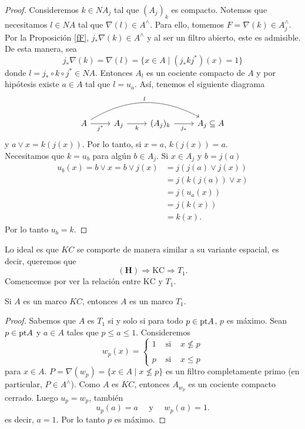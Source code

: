 \begin{proof}
Consideremos $k\in NA_j$ tal que $(A_j)_k$ es compacto. Notemos que necesitamos $l\in NA$ tal que $\nabla(l)\in A^\wedge$. Para ello, tomemos $F=\nabla(k)\in A_j^\wedge$. 
Por la Proposición \ref{fF}, $j_*\nabla(k)\in A^\wedge$ y al ser un filtro abierto, este es admisible. De esta manera, sea 
\[
j_*\nabla(k)=\nabla(l)=\{x\in A\mid (j_*kj^*)(x)=1\}
\]
donde $l=j_*\circ  k\circ j^*\in NA$. Entonces $A_l$ es un cociente compacto de $A$ y por hipótesis existe $a\in A$ tal que $l=u_a$. Así, tenemos el siguiente diagrama 
\[
\begin{tikzcd}
	A \arrow[r, "j^*"'] \arrow[rrr, "l", bend left] & A_j \arrow[r, "k"'] & (A_j)_k \arrow[r, "j_*"'] & A_j\subseteq A
	\end{tikzcd}\]
y $a\vee x=k(j(x))$. Por lo tanto, si $x=a$, $k(j(x))=a$.\\

Necesitamos que $k=u_b$ para algún $b\in A_j$. Si $x\in A_j$ y $b=j(a)$
\[
\begin{split}
u_b(x)= b\vee x= b\vee j(x)& =j(j(a)\vee j(x))\\
& =j(k(j(a))\vee x)\\
& =j(u_a(x))\\
& =j(k(x))\\	
&=k(x).
\end{split}
\]
Por lo tanto $u_b=k$.
\end{proof}

Lo ideal es que $KC$ se comporte de manera similar a su variante espacial, es decir, queremos que 
\[
\mathbf{(H)} \Rightarrow \mathrm{KC} \Rightarrow T_1.
\]
Comencemos por ver la relación entre $\mathrm{KC}$ y $T_1$.

\begin{prop}\label{KCT1}
    Si $A$ es un marco $KC$, entonces $A$ es un marco $T_1$.
\end{prop}

\begin{proof}
Sabemos que $A$ es $T_1$ si y solo si para todo $p\in \mathrm{pt} A$, $p$ es máximo. Sean $p\in \mathrm{pt} A$ y $a\in A$ tales que $p\leq a\leq 1$. Consideremos 
\[
w_p(x)=\left\{\begin{array}{lcc}
1 & \mbox{ si } & x\nleq p\\
\\
p & \mbox{ si } & x\leq p
\end{array}\right.
\]
para $x\in A$. $P=\nabla(w_p)=\{x\in A\mid x\nleq p\}$ es un filtro completamente primo (en particular, $P\in A^\wedge$). Como $A$ es $KC$, entonces $A_{w_p}$ es un cociente compacto cerrado. Luego $u_p=w_p$, también
\[
u_p(a)=a\quad \mbox{ y }\quad w_p(a)=1.
\]
es decir, $a=1$. Por lo tanto $p$ es máximo. 
\end{proof}

